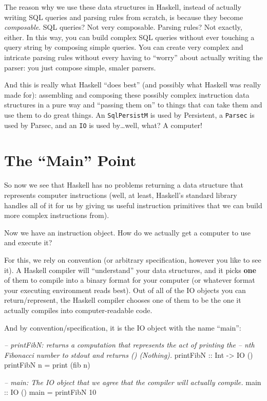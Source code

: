 \documentclass[]{article}
\newenvironment{Shaded}{}{}
\newcommand{\CommentTok}[1]{\textcolor[rgb]{0.38,0.63,0.69}{\textit{#1}}}
\newcommand{\DataTypeTok}[1]{\textcolor[rgb]{0.56,0.13,0.00}{#1}}
\newcommand{\DecValTok}[1]{\textcolor[rgb]{0.25,0.63,0.44}{#1}}
\newcommand{\FunctionTok}[1]{\textcolor[rgb]{0.02,0.16,0.49}{#1}}
\newcommand{\NormalTok}[1]{#1}
\newcommand{\OtherTok}[1]{\textcolor[rgb]{0.00,0.44,0.13}{#1}}
\begin{document}
The reason why we use these data structures in Haskell, instead of actually
writing SQL queries and parsing rules from scratch, is because they become
\emph{composable}. SQL queries? Not very composable. Parsing rules? Not exactly,
either. In this way, you can build complex SQL queries without ever touching a
query string by composing simple queries. You can create very complex and
intricate parsing rules without every having to ``worry'' about actually writing
the parser: you just compose simple, smaler parsers.

And this is really what Haskell ``does best'' (and possibly what Haskell was
really made for): assembling and composing these possibly complex instruction
data structures in a pure way and ``passing them on'' to things that can take
them and use them to do great things. An \texttt{SqlPersistM} is used by
Persistent, a \texttt{Parsec} is used by Parsec, and an \texttt{IO} is used
by\ldots{}well, what? A computer!

\hypertarget{the-main-point}{%
\section{The ``Main'' Point}\label{the-main-point}}

So now we see that Haskell has no problems returning a data structure that
represents computer instructions (well, at least, Haskell's standard library
handles all of it for us by giving us useful instruction primitives that we can
build more complex instructions from).

Now we have an instruction object. How do we actually get a computer to use and
execute it?

For this, we rely on convention (or arbitrary specification, however you like to
see it). A Haskell compiler will ``understand'' your data structures, and it
picks \textbf{one} of them to compile into a binary format for your computer (or
whatever format your executing environment reads best). Out of all of the IO
objects you can return/represent, the Haskell compiler chooses one of them to be
the one it actually compiles into computer-readable code.

And by convention/specification, it is the IO object with the name ``main'':

\begin{Shaded}
\begin{Highlighting}[]
\CommentTok{--  printFibN: returns a computation that represents the act of printing the}
\CommentTok{--      nth Fibonacci number to stdout and returns () (Nothing).}
\OtherTok{printFibN ::} \DataTypeTok{Int} \OtherTok{->} \DataTypeTok{IO}\NormalTok{ ()}
\NormalTok{printFibN n }\FunctionTok{=}\NormalTok{ print (fib n)}

\CommentTok{--  main: The IO object that we agree that the compiler will actually compile.}
\OtherTok{main ::} \DataTypeTok{IO}\NormalTok{ ()}
\NormalTok{main }\FunctionTok{=}\NormalTok{ printFibN }\DecValTok{10}
\end{Highlighting}
\end{Shaded}
\end{document}

